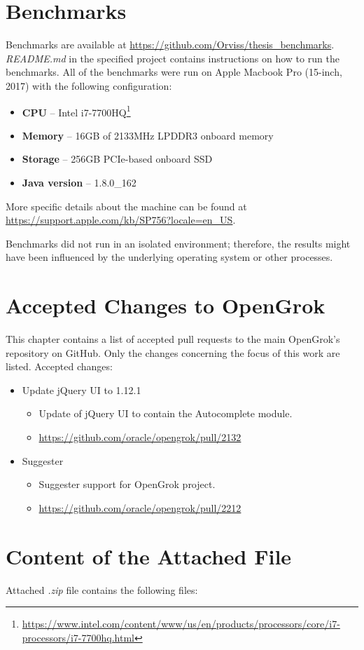 \chapter{Benchmarks}
\label{benchmark_attachment}

Benchmarks are available at \url{https://github.com/Orviss/thesis_benchmarks}. \textit{README.md} in the specified project
contains instructions on how to run the benchmarks. All of the benchmarks were run on Apple Macbook Pro (15-inch, 2017)
with the following configuration:
\begin{itemize}
    \item \textbf{CPU} – Intel i7-7700HQ\footnote{\url{https://www.intel.com/content/www/us/en/products/processors/core/i7-processors/i7-7700hq.html}}
    \item \textbf{Memory} – 16GB of 2133MHz LPDDR3 onboard memory
    \item \textbf{Storage} – 256GB PCIe-based onboard SSD
    \item \textbf{Java version} – 1.8.0\_162
\end{itemize}

More specific details about the machine can be found at \url{https://support.apple.com/kb/SP756?locale=en_US}.

Benchmarks did not run in an isolated environment; therefore, the results might have been influenced by the underlying
operating system or other processes.

\chapter{Accepted Changes to OpenGrok}
This chapter contains a list of accepted pull requests to the main OpenGrok's repository on GitHub. Only the changes
concerning the focus of this work are listed.
Accepted changes:
\begin{itemize}
    \item Update jQuery UI to 1.12.1
    \begin{itemize}
        \item Update of jQuery UI to contain the Autocomplete module.
        \item \url{https://github.com/oracle/opengrok/pull/2132}
    \end{itemize}
    \item Suggester
    \begin{itemize}
        \item Suggester support for OpenGrok project.
        \item \url{https://github.com/oracle/opengrok/pull/2212}
    \end{itemize}
\end{itemize}

\chapter{Content of the Attached File}
Attached \textit{.zip} file contains the following files:
\bigskip
{}
